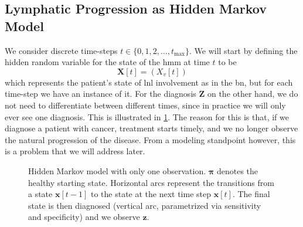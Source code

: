 \documentclass[\relativeRoot/main.tex]{subfiles}
\begin{document}
\subsection{Lymphatic Progression as Hidden Markov Model}
\label{subsec:unilateral:formalism:spread_as_hmm}

We consider discrete time-steps $t \in \{ 0, 1, 2, \ldots, t_\text{max} \}$. We will start by defining the hidden random variable for the state of the \gls{hmm} at time $t$ to be
%
\begin{equation}
    \mathbf{X}[t] = \left( X_v[t] \right)
\end{equation}
%
which represents the patient's state of \gls{lnl} involvement as in the \gls{bn}, but for each time-step we have an instance of it. For the diagnosis $\mathbf{Z}$ on the other hand, we do not need to differentiate between different times, since in practice we will only ever see one diagnosis. This is illustrated in \cref{fig:unilateral:hmm_schema}. The reason for this is that, if we diagnose a patient with cancer, treatment starts timely, and we no longer observe the natural progression of the disease. From a modeling standpoint however, this is a problem that we will address later.

\begin{figure}[h]
    \centering
    \def\svgwidth{0.65\textwidth}
    
    \caption[Schema of how the HMM starts healthy and gets diagnosed eventually]{Hidden Markov model with only one observation. $\boldsymbol{\pi}$ denotes the healthy starting state. Horizontal arcs represent the transitions from a state $\mathbf{x}[t-1]$ to the state at the next time step $\mathbf{x}[t]$. The final state is then diagnosed (vertical arc, parametrized via sensitivity and specificity) and we observe $\mathbf{z}$.}
    \label{fig:unilateral:hmm_schema}
\end{figure}
\end{document}

